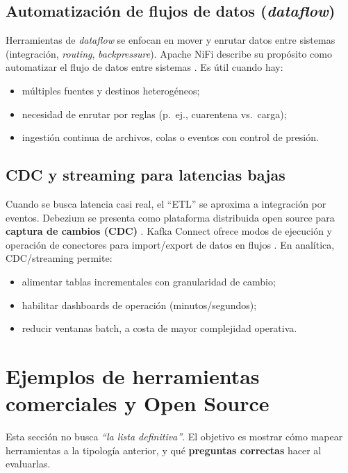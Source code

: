 \documentclass[12pt]{article}
\begin{document}
\subsection{Automatización de flujos de datos (\textit{dataflow})}
Herramientas de \textit{dataflow} se enfocan en mover y enrutar datos entre sistemas (integración, \textit{routing}, \textit{backpressure}). Apache NiFi describe su propósito como automatizar el flujo de datos entre sistemas \cite{nifi_overview}. Es útil cuando hay:
\begin{itemize}[leftmargin=*]
  \item múltiples fuentes y destinos heterogéneos;
  \item necesidad de enrutar por reglas (p.\ ej., cuarentena vs.\ carga);
  \item ingestión continua de archivos, colas o eventos con control de presión.
\end{itemize}

\subsection{CDC y streaming para latencias bajas}
Cuando se busca latencia casi real, el “ETL” se aproxima a integración por eventos. Debezium se presenta como plataforma distribuida open source para \textbf{captura de cambios (CDC)} \cite{debezium_home}. Kafka Connect ofrece modos de ejecución y operación de conectores para import/export de datos en flujos \cite{kafka_connect_user_guide}. En analítica, CDC/streaming permite:
\begin{itemize}[leftmargin=*]
  \item alimentar tablas incrementales con granularidad de cambio;
  \item habilitar dashboards de operación (minutos/segundos);
  \item reducir ventanas batch, a costa de mayor complejidad operativa.
\end{itemize}

\section{Ejemplos de herramientas comerciales y Open Source}
Esta sección no busca \textit{“la lista definitiva”}. El objetivo es mostrar cómo mapear herramientas a la tipología anterior, y qué \textbf{preguntas correctas} hacer al evaluarlas.
\end{document}
